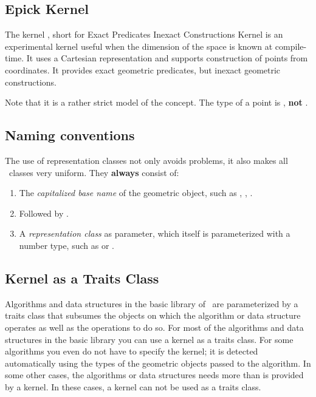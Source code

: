 \subsection{Epick Kernel}

The kernel , short for Exact Predicates Inexact Constructions Kernel is an experimental kernel useful when the dimension of the space is known at compile-time. It uses a Cartesian representation and supports construction of points from  coordinates. It provides exact geometric predicates, but inexact geometric constructions.

Note that it is a rather strict model of the  concept. The type of a point is , {\bf not} .

\subsection{Naming conventions}

The use of representation classes not only avoids problems, it also
makes all \cgal\ classes very uniform. They {\bf always} consist of:
\begin{enumerate}
\begin{ccTexOnly}
\itemsep0pt\parskip0pt
\end{ccTexOnly}

\item The {\em capitalized base name} of the geometric object, such as
  , , .

\item Followed by .
  
\item A {\em representation class} as parameter, which itself is
  parameterized with a number type, such as
   or .
\end{enumerate}

\subsection{Kernel as a Traits Class}

Algorithms and data structures in the basic library of \cgal\ are
parameterized by a traits class that subsumes the objects on which the
algorithm or data structure operates as well as the operations to do
so. For most of the algorithms and data structures in the basic
library you can use a kernel as a traits class. For some algorithms
you even do not have to specify the kernel; it is detected
automatically using the types of the geometric objects passed to the
algorithm. In some other cases, the algorithms or data structures
needs more than is provided by a kernel. In these cases, a kernel can
not be used as a traits class.

